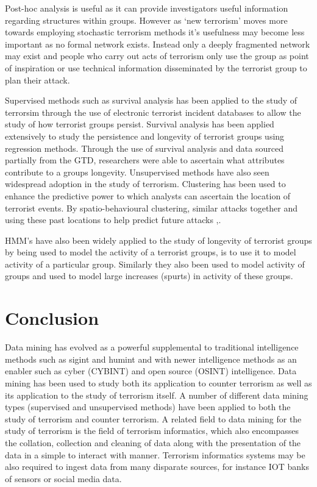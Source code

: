 Post-hoc analysis is useful as it can provide investigators useful information regarding structures within groups. However as ‘new terrorism’ moves more towards employing stochastic terrorism methods it’s usefulness may become less important as no formal network exists. Instead only a deeply fragmented network may exist and people who carry out acts of terrorism only use the group as point of inspiration or use technical information disseminated by the terrorist group to plan their attack.

Supervised methods such as survival analysis has been applied to the study of terrorsim through the use of electronic terrorist incident databases to allow the study of how terrorist groups persist. Survival analysis has been applied extensively to study the persistence and longevity of terrorist groups using regression methods. Through the use of survival analysis and data sourced partially from the GTD, researchers  \citep{young2014survival} were able to ascertain what attributes contribute to a groups longevity. Unsupervised methods have also seen widespread adoption in the study of terrorism. Clustering has been used to enhance the predictive power to which analysts can ascertain the location of terrorist events. By spatio-behavioural clustering, similar attacks together and using these past locations to help predict future attacks \citep{townsley2008space},\citep{brown2004spatial}.

HMM’s \citep{allanach2004detecting}  have also been widely applied to the study of longevity of terrorist groups by being used to model the activity of a terrorist groups, is to use it to model activity of a particular group. Similarly they also been used to model activity of groups and used to model large increases (spurts) in activity of these groups. 

\section{Conclusion}

Data mining has evolved as a powerful supplemental to traditional intelligence methods such as sigint and humint and with newer intelligence methods  as an enabler  such as cyber (CYBINT) and open source (OSINT) intelligence. 
Data mining has been used to study both its application to counter terrorism as well as its application to the study of terrorism itself. A number of different data mining types (supervised and unsupervised methods) have been applied to both the study of terrorism and counter terrorism. A related field to data mining for the study of terrorism is the field of terrorism informatics, which also encompasses the collation, collection and cleaning of data along with the presentation of the data in a simple to interact with manner. Terrorism informatics systems may be also required to ingest data from many disparate sources, for instance IOT banks of sensors or social media data.

